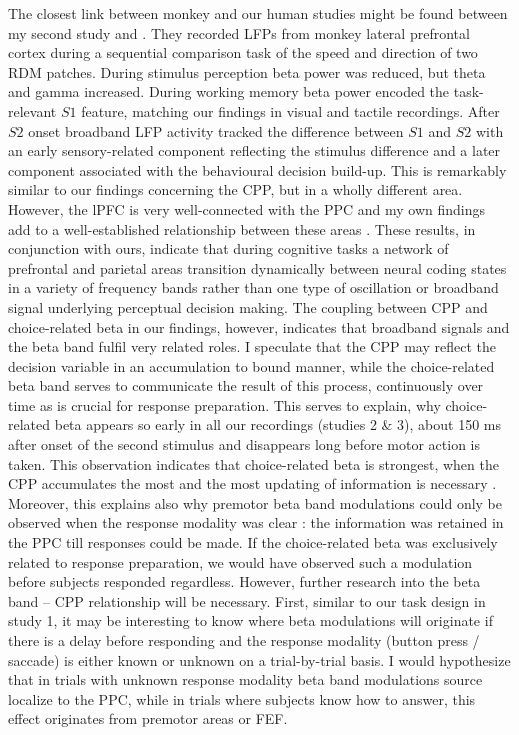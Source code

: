 The closest link between monkey and our human studies might be found between my second study and \textcite{Wimmer2016}. They recorded LFPs from monkey lateral prefrontal cortex during a sequential comparison task of the speed and direction of two RDM patches. During stimulus perception beta power was reduced, but theta and gamma increased. During working memory beta power encoded the task-relevant $S1$ feature, matching our findings in visual and tactile recordings. After $S2$ onset broadband LFP activity tracked the difference between $S1$ and $S2$ with an early sensory-related component reflecting the stimulus difference and a later component associated with the behavioural decision build-up. This is remarkably similar to our findings concerning the CPP, but in a wholly different area. However, the lPFC is very well-connected with the PPC \parencite{Cole2010} and my own findings add to a well-established relationship between these areas \parencite{Cole2013,Cole2007,Duncan2010,Muhle-Karbe2017,Nieder2016}. These results, in conjunction with ours, indicate that during cognitive tasks a network of prefrontal and parietal areas transition dynamically between neural coding states in a variety of frequency bands rather than one type of oscillation or broadband signal underlying perceptual decision making. The coupling between CPP and choice-related beta in our findings, however, indicates that broadband signals and the beta band fulfil very related roles. I speculate that the CPP may reflect the decision variable in an accumulation to bound manner, while the choice-related beta band serves to communicate the result of this process, continuously over time as is crucial for response preparation. This serves to explain, why choice-related beta appears so early in all our recordings (studies 2 \& 3), about 150 ms after onset of the second stimulus and disappears long before motor action is taken. This observation indicates that choice-related beta is strongest, when the CPP accumulates the most and the most updating of information is necessary \parencite{Twomey2015}. Moreover, this explains also why premotor beta band modulations could only be observed when the response modality was clear \parencite{Ludwig2018}: the information was retained in the PPC till responses could be made. If the choice-related beta was exclusively related to response preparation, we would have observed such a modulation before subjects responded regardless. However, further research into the beta band – CPP relationship will be necessary. 
First, similar to our task design in study 1, it may be interesting to know where beta modulations will originate if there is a delay before responding and the response modality (button press / saccade) is either known or unknown on a trial-by-trial basis. I would hypothesize that in trials with unknown response modality beta band modulations source localize to the PPC, while in trials where subjects know how to answer, this effect originates from premotor areas or FEF. 
